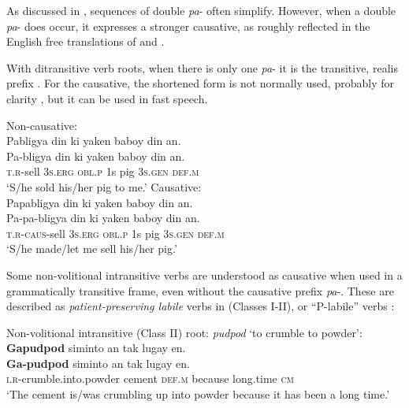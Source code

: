 As discussed in  , sequences of double \textit{pa}- often simplify. However, when a double \textit{pa}- does occur, it expresses a stronger causative, as roughly reflected in the English free translations of  and .

With ditransitive verb roots, when there is only one \textit{pa}{}- it is the transitive, realis prefix . For the causative, the shortened form is not normally used, probably for clarity , but it can be used in fast speech.

\ea
\label{bkm:Ref236213080}
Non-causative: \\
Pabligya  din  ki  yaken  baboy  din  an. \\\smallskip
\gll Pa-bligya  din  ki  yaken  baboy  din  an. \\
\textsc{t.r}-sell  3\textsc{s.erg}  \textsc{obl.p}  1s  pig  3\textsc{s.gen}  \textsc{def.m} \\
\glt ‘S/he sold his/her pig to me.’
\z
\ea
\label{bkm:Ref329253571}
Causative: \\
Papabligya  din  ki  yaken  baboy  din  an. \\\smallskip
\gll Pa-pa-bligya  din  ki  yaken  baboy  din  an. \\
\textsc{t.r}-\textsc{caus}-sell  3\textsc{s.erg}  \textsc{obl.p}  1s  pig  3\textsc{s.gen}  \textsc{def.m} \\
\glt ‘S/he made/let me sell his/her pig.’
\z

Some non-volitional intransitive verbs are understood as causative when used in a grammatically transitive frame, even without the causative prefix \textit{pa}{}-. These are described as \textit{patient-preserving labile} verbs in  (Classes I-II),  or “P-labile” verbs \citep{haspelmath1993, kulikov2014}:

\ea
Non-volitional intransitive (Class II) root: \textit{pudpod} ‘to crumble to powder’: \\
\textbf{Gapudpod}  siminto  an  tak  lugay  en. \\\smallskip
\gll \textbf{Ga-pudpod}  siminto  an  tak  lugay  en. \\
\textsc{i.r}-crumble.into.powder  cement  \textsc{def.m}  because  long.time  \textsc{cm} \\
\glt ‘The cement is/was crumbling up into powder because it has been a long time.’
\z

